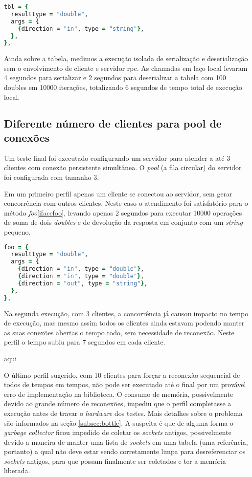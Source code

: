 \documentclass[11pt]{article}
\begin{document}
\begin{lstlisting}[label={ifacetbl},language=Ruby,caption=Interface tbl]
tbl = {
  resulttype = "double",
  args = {
    {direction = "in", type = "string"},
  },
},
\end{lstlisting}

Ainda sobre a tabela, medimos a execução isolada de serialização e
deserialização sem o envolvimento de cliente e servidor \gls{rpc}. As chamadas
em laço local levaram 4 segundos para serializar e 2 segundos para deserializar
a tabela com 100 doubles em 10000 iterações, totalizando 6 segundos de tempo
total de execução local.

\subsection{Diferente número de clientes para pool de conexões}\label{subsec:diffpool}

Um teste final foi executado configurando um servidor para atender a até 3
clientes com conexão persistente simultânea. O \textit{pool} (a fila circular)
do servidor foi configurada com tamanho 3.

Em um primeiro perfil apenas um cliente se conectou ao servidor, sem gerar
concorrência com outros clientes. Neste caso o atendimento foi satisfatório
para o método \textit{foo}\ref{ifacefoo}, levando apenas 2 segundos para
executar 10000 operações de soma de dois \textit{doubles} e de devolução da
resposta em conjunto com um \textit{string} pequeno.

\begin{lstlisting}[label={ifacefoo},language=Ruby,caption=Interface foo]
foo = {
  resulttype = "double",
  args = {
    {direction = "in", type = "double"},
    {direction = "in", type = "double"},
    {direction = "out", type = "string"},
  },
},
\end{lstlisting}

Na segunda execução, com 3 clientes, a concorrência já causou impacto no tempo
de execução, mas mesmo assim todos os clientes ainda estavam podendo manter as
suas conexões abertas o tempo todo, sem necessidade de reconexão.  Neste perfil
o tempo subiu para 7 segundos em cada cliente.

aqui

O último perfil sugerido, com 10 clientes para forçar a reconexão sequencial de
todos de tempos em tempos, não pode ser executado até o final por um provável
erro de implementação na biblioteca. O consumo de memória, possivelmente devido
ao grande número de reconexões, impediu que o perfil completasse a execução
antes de travar o \textit{hardware} dos testes. Mais detalhes sobre o problema
são informados na seção \ref{subsec:bottle}. A suspeita é que de alguma forma o
\textit{garbage collector} ficou impedido de coletar os \textit{sockets}
antigos, possivelmente devido a maneira de manter uma lista de \textit{sockets}
em uma tabela (uma referência, portanto) a qual não deve estar sendo
corretamente limpa para desreferenciar os \textit{sockets} antigos, para que
possam finalmente ser coletados e ter a memória liberada.
\end{document}
